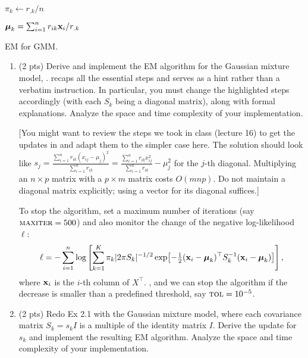 \documentclass{tron}
\begin{document}
\begin{exercise}{}
\begin{algorithm}[H]
{			$\pi_k \gets r_{.k} / n$
			
			$\boldsymbol{\mu}_k = \sum_{i=1}^n r_{ik} \mathbf{x}_i / r_{.k}$
			
		}
		\caption{EM for GMM.}
		\label{alg:gmm}
	\end{algorithm}
	
	\begin{enumerate}
		\item (2 pts) Derive and implement the EM algorithm for the  Gaussian mixture model, .  recaps all the essential steps and serves as a hint rather than a verbatim instruction. In particular, you must change the highlighted steps accordingly (with each $S_k$ being a diagonal matrix), along with formal explanations. Analyze the space and time complexity of your implementation. 
		
		[You might want to review the steps we took in class (lecture 16) to get the updates in  and adapt them to the simpler case here. The solution should look like $s_j = \frac{\sum_{i=1}^n r_{ik} (x_{ij} - \mu_j)^2}{\sum_{i=1}^n r_{ik} } = \frac{\sum_{i=1}^n r_{ik} x_{ij} ^2}{\sum_{i=1}^n r_{ik} } - \mu_j^2$ for the $j$-th diagonal. Multiplying an $n\times p$ matrix with a $p\times m$ matrix costs $O(mnp)$. Do not maintain a diagonal matrix explicitly; using a vector for its diagonal suffices.]
		
		To stop the algorithm, set a maximum number of iterations (say $\textsc{maxiter} = 500$) and also monitor the change of the negative log-likelihood $\ell$: 
		\begin{align}
		\ell = -\sum_{i=1}^n \log\left[\sum_{k=1}^K \pi_k |2\pi S_k|^{-1/2} \exp[ -\tfrac{1}{2}(\mathbf{x}_i -\boldsymbol{\mu}_k)^\top S_k^{-1} (\mathbf{x}_i - \boldsymbol{\mu}_k ) ]\right],
		\end{align}
		where $\mathbf{x}_i$ is the $i$-th column of $X^\top$.
		, and we can stop the algorithm if the decrease is smaller than a predefined threshold, say $\textsc{tol} = 10^{-5}$.
		
		\ans{}
			
		\item (2 pts) Redo Ex 2.1 with the  Gaussian mixture model, where each covariance matrix $S_k = s_k I$ is a multiple of the identity matrix $I$. Derive the update for $s_k$ and implement the resulting EM algorithm. Analyze the space and time complexity of your implementation.
		

\end{enumerate}
\end{exercise}
\end{document}
